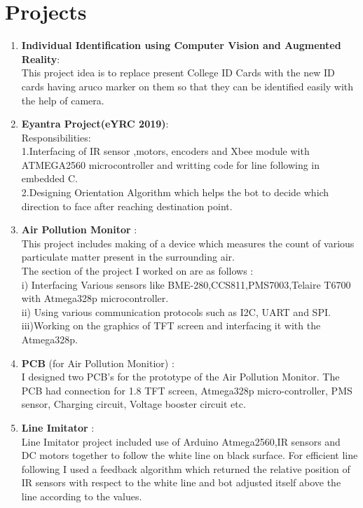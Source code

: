 \documentclass[11pt]{article}
\begin{document}
\section{Projects}
\begin{enumerate}[label=(\arabic*)]

\item\textbf{Individual Identification using Computer Vision and Augmented Reality}:\\
This project idea is to replace present College ID Cards with the new ID cards having aruco marker on them so that they can be identified easily with the help of camera.

\item\textbf{Eyantra Project(eYRC 2019)}:\\
 Responsibilities:\\
1.Interfacing of IR sensor ,motors, encoders and Xbee module with ATMEGA2560 microcontroller and writting code for line following in embedded C.\\
2.Designing Orientation Algorithm which helps the bot to decide which direction to face after reaching destination point.

\item\textbf{ Air Pollution Monitor} :\\
 This project includes making of a device which measures the count of various particulate matter  present in the surrounding air.\\
The section of the project I worked on are as follows :\\
i)  Interfacing Various sensors like BME-280,CCS811,PMS7003,Telaire T6700 with Atmega328p microcontroller.\\
ii) Using various communication protocols such as I2C, UART and SPI.\\
iii)Working on the graphics of TFT screen and interfacing it with the Atmega328p.

\item\textbf{PCB }(for Air Pollution Monitior) :\\
I designed two PCB's for the prototype of the Air Pollution Monitor. The PCB had connection for 1.8 TFT screen, Atmega328p micro-controller, PMS sensor, Charging circuit, Voltage booster circuit etc.

\item\textbf{Line Imitator} :\\
Line Imitator project included use of Arduino Atmega2560,IR sensors and DC motors together to follow the white line on black surface. For efficient line following I used a feedback algorithm which returned the relative position of IR sensors with respect to the white line and bot adjusted itself above the line according to the values.


\end{enumerate}
\end{document}
